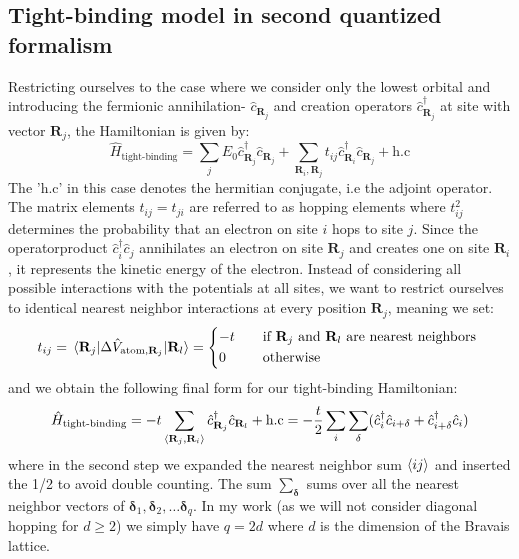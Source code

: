\documentclass[11pt, a4paper]{article}
\theoremstyle{definition} %
\begin{document}
\subsection{Tight-binding model in second quantized formalism}
Restricting ourselves to the case where we consider only the lowest orbital and introducing the fermionic annihilation- $\hat{c}_{\mathbf{R}_j}$ and creation operators $\hat{c}^\dagger_{\mathbf{R}_j}$ at site with vector $\mathbf{R}_j$, the Hamiltonian is given by:
\begin{equation}
	\hat{H}_\text{tight-binding} = \sum_{j} E_0 \hat{c}_{\mathbf{R}_j}^\dagger \hat{c}_{\mathbf{R}_j} + \sum_{\mathbf{R}_i, \mathbf{R}_j} t_{ij} \hat{c}_{\mathbf{R}_i}^\dagger \hat{c}_{\mathbf{R}_j} + \text{h.c}
\end{equation}
The 'h.c' in this case denotes the hermitian conjugate, i.e the adjoint operator. The matrix elements $t_{ij} = t_{ji}$ are referred to as hopping elements where $t_{ij}^2$ determines the probability that an electron on site $i$ hops to site $j$. Since the operatorproduct $\hat{c}_i^\dagger \hat{c}_j$ annihilates an electron on site $\mathbf{R}_j$ and creates one on site $\mathbf{R}_i$, it represents the kinetic energy of the electron. Instead of considering all possible interactions with the potentials at all sites, we want to restrict ourselves to identical nearest neighbor interactions at every position $\mathbf{R}_j$, meaning we set:
\begin{equation}
	t_{ij} = \mel{\mathbf{R}_j}{\Delta \hat{V}_{\text{atom}, \mathbf{R}_j}}{\mathbf{R}_l} = \begin{dcases}
		-t \quad &\text{if $\mathbf{R}_j$ and $\mathbf{R}_l$ are nearest neighbors }\\
		0 \quad & \text{otherwise}
		\end{dcases}
\end{equation}
and we obtain the following final form for our tight-binding Hamiltonian:
\begin{equation}
	\hat{H}_{\text{tight-binding}} = - t \sum_{\expval{\mathbf{R}_j, \mathbf{R}_i}} \hat{c}_{\mathbf{R}_j}^\dagger \hat{c}_{\mathbf{R}_l} + \text{h.c} = -\frac{t}{2} \sum_{i}\sum_{\mathbf{\delta}} (\hat{c}_i^\dagger \hat{c}_{i + \mathbf{\delta}} + \hat{c}_{i + \mathbf{\delta}}^\dagger \hat{c}_i)
	\label{eq:general_tight_binding}
\end{equation}
where in the second step we expanded the nearest neighbor sum $\expval{ij}$ and inserted the 1/2 to avoid double counting. The sum $\sum_{\mathbf{\delta}}$ sums over all the nearest neighbor vectors of $\mathbf{\delta}_1, \mathbf{\delta}_2, \dots \mathbf{\delta}_q$. In my work (as we will not consider diagonal hopping for $d \geq 2$) we simply have $q = 2d$ where $d$ is the dimension of the Bravais lattice. \\
\end{document}
